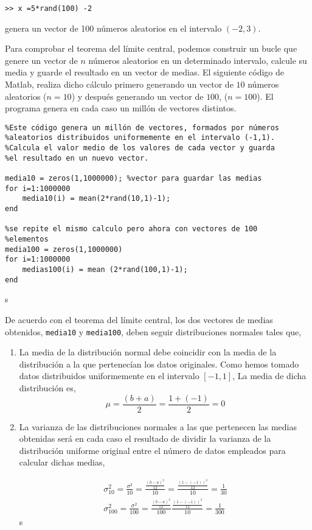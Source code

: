 \begin{verbatim}
>> x =5*rand(100) -2
\end{verbatim}
genera un vector de 100 números aleatorios en el intervalo $(-2,3)$.

Para comprobar el teorema del límite central, podemos construir un bucle que genere un vector de $n$ números aleatorios en un determinado intervalo, calcule su media y guarde el resultado en un vector de medias. El siguiente código de Matlab, realiza dicho cálculo primero generando un vector de $10$ números aleatorios ($n = 10$) y después generando un vector de $100$, ($n=100$).  El programa genera en cada caso un millón de vectores distintos.
\begin{verbatim}
%Este código genera un millón de vectores, formados por números 
%aleatorios distribuidos uniformemente en el intervalo (-1,1).
%Calcula el valor medio de los valores de cada vector y guarda
%el resultado en un nuevo vector.

media10 = zeros(1,1000000); %vector para guardar las medias
for i=1:1000000
 	media10(i) = mean(2*rand(10,1)-1);
end

%se repite el mismo calculo pero ahora con vectores de 100
%elementos
media100 = zeros(1,1000000)
for i=1:1000000
	medias100(i) = mean (2*rand(100,1)-1);
end	
\end{verbatim}s

De acuerdo con el teorema del límite central, los dos vectores de medias obtenidos, \texttt{media10} y \texttt{media100}, deben seguir distribuciones normales tales que,
\begin{enumerate}
\item La media de la distribución normal debe coincidir con la media de la distribución a la que pertenecían los datos originales. Como hemos tomado datos distribuidos uniformemente en el intervalo $[-1,1]$, La media de dicha distribución es,
\begin{equation*}
\mu = \frac{(b+a)}{2}=\frac{1+(-1)}{2}=0
\end{equation*}
\item La varianza de las distribuciones normales a las que pertenecen las medias obtenidas será en cada caso el resultado de dividir la varianza de la distribución uniforme original entre el número de datos empleados para calcular dichas medias,


\begin{align*}
\sigma_{10}^2 = \frac{\sigma^2}{10}=\frac{\frac{(b-a)^2}{12}}{10}=\frac{\frac{(1-(-1))^2}{12}}{10}=\frac{1}{30}\\
\sigma_{100}^2 = \frac{\sigma^2}{100}=\frac{\frac{(b-a)^2}{12}}{100}\frac{\frac{(1-(-1))^2}{12}}{10}=\frac{1}{300}
\end{align*}s
\end{enumerate}

